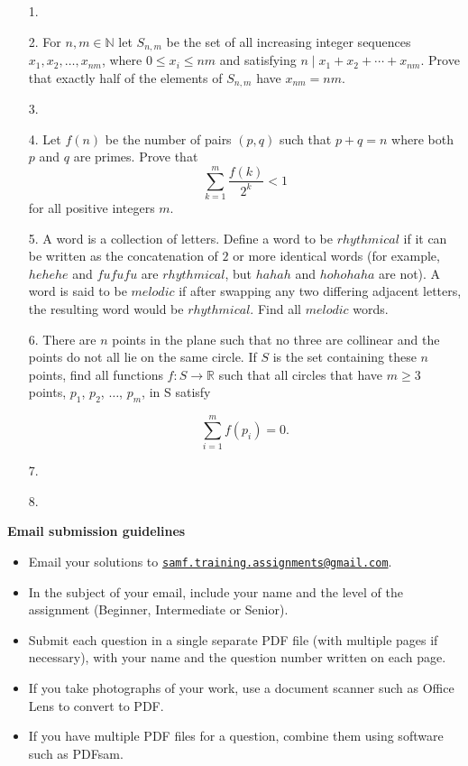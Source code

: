\documentclass{article}
\begin{document}
\begin{enumerate}

\bigskip
\item[1.] %


\medskip
\item[2.] %
For $n,m\in\mathbb{N}$ let $S_{n,m}$ be the set of all increasing integer sequences $x_{1},x_{2},\ldots,x_{nm}$, where $0\leq x_i\leq nm$ and satisfying $n \mid x_{1} + x_{2} + \cdots +x_{nm}$. Prove that exactly half of the elements of $S_{n,m}$ have $x_{nm}=nm$.


\medskip
\item[3.] %


\medskip
\item[4.] %
Let $f(n)$ be the number of pairs $(p, q)$ such that $p + q = n$ where both $p$ and $q$ are primes. Prove that
$$\sum_{k = 1}^{m} \frac{f(k)}{2^k} < 1$$
for all positive integers $m$.



\medskip
\item[5.] %
 A word is a collection of letters. Define a word to be $rhythmical$ if it can be written as the concatenation of $2$ or more identical words (for example, $hehehe$ and $fufufu$ are $rhythmical$, but $hahah$ and $hohohaha$ are not). A word is said to be $melodic$ if after swapping any two differing adjacent letters, the resulting word would be $rhythmical$. Find all $melodic$ words.


\medskip
\item[6.] %
There are $n$ points in the plane such that no three are collinear and the points do not all lie on the same circle. If $S$ is the set containing these $n$ points, find all functions $f : S \rightarrow \mathbb{R}$ such that all circles that have $m \ge 3$ points, $p_1$, $p_2$, $\dots$, $p_m$, in S satisfy

$$\sum_{i = 1}^{m} f(p_i) = 0.$$



\medskip
\item[7.] %


\medskip
\item[8.] %


\end{enumerate}


\vfill
\textbf{\Large Email submission guidelines}
\begin{itemize}
	\item Email your solutions to \href{mailto:samf.training.assignments@gmail.com}{\texttt{samf.training.assignments@gmail.com}}.
	\item In the subject of your email, include your name and the level of the assignment (Beginner, Intermediate or Senior).
	\item Submit each question in a single separate PDF file (with multiple pages if necessary), with your name and the question number written on each page.
	\item If you take photographs of your work, use a document scanner such as Office Lens to convert to PDF.
	\item If you have multiple PDF files for a question, combine them using software such as PDFsam.
\end{itemize}
\end{document}
